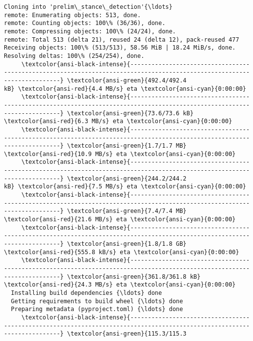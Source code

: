 \documentclass[11pt]{article}
\begin{document}
    \begin{Verbatim}[commandchars=\\\{\}]
Cloning into 'prelim\_stance\_detection'{\ldots}
remote: Enumerating objects: 513, done.
remote: Counting objects: 100\% (36/36), done.
remote: Compressing objects: 100\% (24/24), done.
remote: Total 513 (delta 21), reused 24 (delta 12), pack-reused 477
Receiving objects: 100\% (513/513), 58.56 MiB | 18.24 MiB/s, done.
Resolving deltas: 100\% (254/254), done.
     \textcolor{ansi-black-intense}{------------------------------------------------------------------------------------------------------------------------} \textcolor{ansi-green}{492.4/492.4
kB} \textcolor{ansi-red}{4.4 MB/s} eta \textcolor{ansi-cyan}{0:00:00}
     \textcolor{ansi-black-intense}{------------------------------------------------------------------------------------------------------------------------} \textcolor{ansi-green}{73.6/73.6 kB}
\textcolor{ansi-red}{6.3 MB/s} eta \textcolor{ansi-cyan}{0:00:00}
     \textcolor{ansi-black-intense}{------------------------------------------------------------------------------------------------------------------------} \textcolor{ansi-green}{1.7/1.7 MB}
\textcolor{ansi-red}{10.9 MB/s} eta \textcolor{ansi-cyan}{0:00:00}
     \textcolor{ansi-black-intense}{------------------------------------------------------------------------------------------------------------------------} \textcolor{ansi-green}{244.2/244.2
kB} \textcolor{ansi-red}{7.5 MB/s} eta \textcolor{ansi-cyan}{0:00:00}
     \textcolor{ansi-black-intense}{------------------------------------------------------------------------------------------------------------------------} \textcolor{ansi-green}{7.4/7.4 MB}
\textcolor{ansi-red}{21.6 MB/s} eta \textcolor{ansi-cyan}{0:00:00}
     \textcolor{ansi-black-intense}{------------------------------------------------------------------------------------------------------------------------} \textcolor{ansi-green}{1.8/1.8 GB}
\textcolor{ansi-red}{555.8 kB/s} eta \textcolor{ansi-cyan}{0:00:00}
     \textcolor{ansi-black-intense}{------------------------------------------------------------------------------------------------------------------------} \textcolor{ansi-green}{361.8/361.8 kB}
\textcolor{ansi-red}{24.3 MB/s} eta \textcolor{ansi-cyan}{0:00:00}
  Installing build dependencies {\ldots} done
  Getting requirements to build wheel {\ldots} done
  Preparing metadata (pyproject.toml) {\ldots} done
     \textcolor{ansi-black-intense}{------------------------------------------------------------------------------------------------------------------------} \textcolor{ansi-green}{115.3/115.3

\end{Verbatim}
\end{document}
